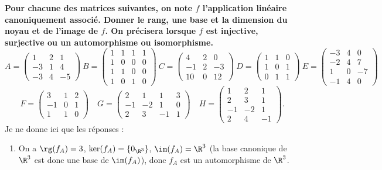 \documentclass[a4paper, 11pt,reqno]{article}
\begin{document}
\begin{correction}   \;
	\textbf{Pour chacune des matrices suivantes, on note $f$ l'application lin\'eaire canoniquement associ\'e. Donner le rang, une base et la dimension du noyau et de l'image de $f$. On pr\'ecisera lorsque $f$ est injective, surjective ou un automorphisme ou isomorphisme.}
	$$A=\left(\begin{array}{rrr} 1&2&1 \\ -3&1&4 \\ -3&4&-5    \end{array}\right)\
		B=\left(\begin{array}{rrrr} 1&1&1&1 \\ 1&0&0&0 \\ 1&1&0&0 \\ 1&0&1&0    \end{array}\right)\
		C=\left(\begin{array}{rrr} 4&2&0 \\ -1&2&-3 \\ 10&0&12    \end{array}\right) \
		D=\left(\begin{array}{rrr} 1&1&0 \\ 1&0&1 \\ 0&1&1    \end{array}\right)\
		E=\left(\begin{array}{rrr} -3&4&0 \\ -2&4&7 \\ 1&0&-7 \\-1&4&0    \end{array}\right)$$
	$$F=\left(\begin{array}{rrr} 3&1&2\\ -1&0&1\\ 1&1&0  \end{array}\right)\quad G=\left(\begin{array}{rrrr} 2&1&1&3\\ -1&-2&1&0\\ 2&3&-1&1  \end{array}\right)\quad
		H=\left(\begin{array}{rrr} 1&2&1\\ 2&3&1\\ -1&-2&1\\ 2&4&-1  \end{array}\right).$$
	Je ne donne ici que les r\'eponses :
	\begin{enumerate}
		\item On a $\rg (f_A) = 3$, $\ker (f_A) = \{0_{\R^3}\}$, $\im (f_A) = \R^3$ (la base canonique de $\R^3$ est donc une base de $\im (f_A)$), donc $f_A$ est un automorphisme de $\R^3$.

\end{enumerate}
\end{correction}
\end{document}
